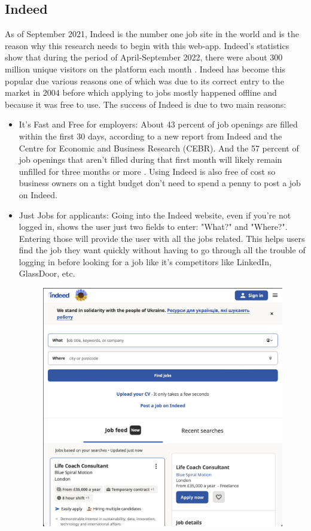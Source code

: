 \subsection{Indeed}
As of September 2021, Indeed is the number one job site in the world \parencite{Reference2} and is the reason why this research needs to begin with this web-app. Indeed's statistics show that during the period of April-September 2022, there were about 300 million unique visitors on the platform each month \parencite{Reference3}. Indeed has become this popular due various reasons one of which was due to its correct entry to the market in 2004 before which applying to jobs mostly happened offline and because it was free to use. The success of Indeed is due to two main reasons: 
\begin{itemize}
    \item It's Fast and Free for employers: About 43 percent of job openings are filled within the first 30 days, according to a new report from Indeed and the Centre for Economic and Business Research (CEBR). And the 57 percent of job openings that aren’t filled during that first month will likely remain unfilled for three months or more \parencite{Reference7}. Using Indeed is also free of cost so business owners on a tight budget don't need to spend a penny to post a job on Indeed. 
    \item Just Jobs for applicants: Going into the Indeed website, even if you're not logged in, shows the user just two fields to enter: "What?" and "Where?". Entering those will provide the user with all the jobs related. This helps users find the job they want quickly without having to go through all the trouble of logging in before looking for a job like it's competitors like LinkedIn, GlassDoor, etc. 
    \begin{figure}
        \noindent
        \centering
        \includegraphics[width = 140mm]{Figures/IndeedHomepage.png}

\end{figure}
\end{itemize}
